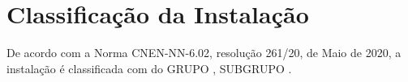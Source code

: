\chapter{Classificação da Instalação}
De acordo com a Norma CNEN-NN-6.02, resolução 261/20, de Maio de 2020, a instalação é classificada com do GRUPO \instalacaoGRUPO, SUBGRUPO \instalacaoSUBGRUPO.